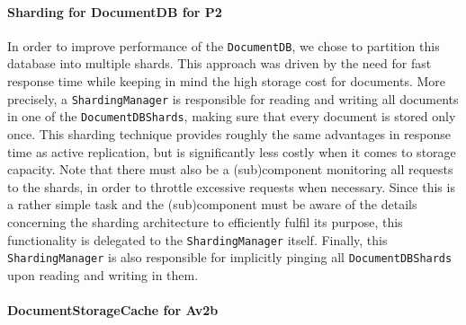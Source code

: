 \documentclass[a4paper,10pt]{article}
\begin{document}
\paragraph{Sharding for DocumentDB for P2}
In order to improve performance of the \texttt{DocumentDB}, we chose to partition this database into multiple shards. This approach was driven by the need for fast response time while keeping in mind the high storage cost for documents. More precisely, a \texttt{ShardingManager} is responsible for reading and writing all documents in one of the \texttt{DocumentDBShards}, making sure that every document is stored only once. This sharding technique provides roughly the same advantages in response time as active replication, but is significantly less costly when it comes to storage capacity.
Note that there must also be a (sub)component monitoring all requests to the shards, in order to throttle excessive requests when necessary. Since this is a rather simple task and the (sub)component must be aware of the details concerning the sharding architecture to efficiently fulfil its purpose, this functionality is delegated to the \texttt{ShardingManager} itself. Finally, this \texttt{ShardingManager} is also responsible for implicitly pinging all \texttt{DocumentDBShards} upon reading and writing in them.

\paragraph{DocumentStorageCache for Av2b}
\end{document}
